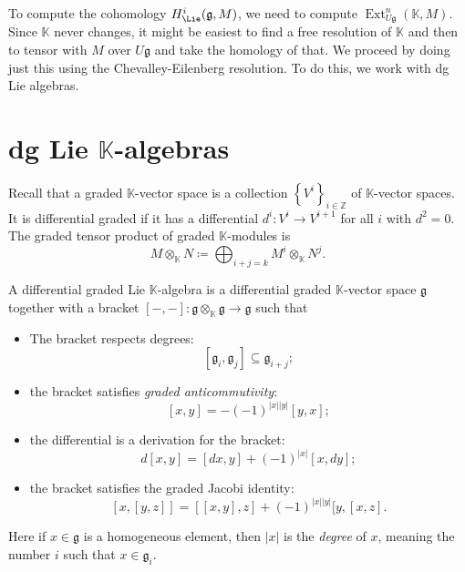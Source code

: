 
To compute the cohomology $H^i_{\Lie }(\mathfrak{g} ,M)$, we need to compute $\operatorname{Ext}^n_{U\mathfrak{g} } (\mathbb{K} ,M)$. Since $\mathbb{K} $ never changes, it might be easiest to find a free resolution of $\mathbb{K} $ and then to tensor with $M$ over $U\mathfrak{g} $ and take the homology of that. We proceed by doing just this using the Chevalley-Eilenberg resolution. To do this, we work with dg Lie algebras.

\section{dg Lie $\mathbb{K} $-algebras}

Recall that a graded $\mathbb{K} $-vector space is a collection $\left\{ V^i \right\}_{i\in\mathbb{Z} } $ of $\mathbb{K} $-vector spaces. It is differential graded if it has a differential $d^i : V^i \to V^{i+1} $ for all $i$ with $d^2=0$. The graded tensor product of graded $\mathbb{K} $-modules is
\[
	M\otimes_\mathbb{K} N \coloneqq \bigoplus_{i+j=k} M^i\otimes _\mathbb{K} N^j
.\]

\begin{definition}\label{3.3.1}
	A differential graded Lie $\mathbb{K} $-algebra is a differential graded $\mathbb{K} $-vector space $\mathfrak{g} $ together with a bracket $[-,-] : \mathfrak{g} \otimes_\mathbb{K} \mathfrak{g}  \to \mathfrak{g} $ such that
	\begin{itemize}
		\item The bracket respects degrees:
			\[
				[\mathfrak{g}_i, \mathfrak{g} _j]\subseteq \mathfrak{g} _{i+j} ;
			\]
		\item the bracket satisfies \emph{graded anticommutivity}:
			\[
				[x,y]=-(-1)^{\left| x \right| \left| y \right| } [y,x]
			;\]
		\item the differential is a derivation for the bracket:
			\[
				d[x,y]=[dx,y]+(-1)^{\left| x \right| } [x,dy]
			;\]
		\item the bracket satisfies the graded Jacobi identity:
			\[
				[x,[y,z]]=[[x,y],z]+(-1)^{\left| x \right| \left| y \right| } [y,[x,z]
			.\]
	\end{itemize}
	Here if $x\in \mathfrak{g} $ is a homogeneous element, then $\left| x \right| $ is the \emph{degree} of $x$, meaning the number $i$ such that $x\in \mathfrak{g} _i$.
\end{definition}

